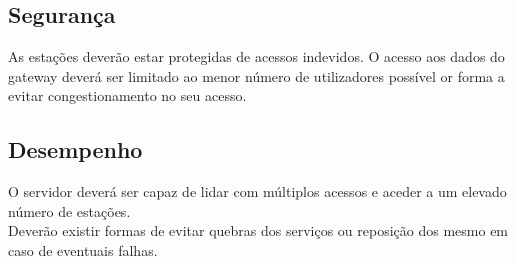 	\subsection{Segurança}
	As estações deverão estar protegidas de acessos indevidos. O acesso aos dados do gateway deverá ser limitado ao menor número de utilizadores possível or forma a evitar congestionamento no seu acesso. 

	\subsection{Desempenho}
	O servidor deverá ser capaz de lidar com múltiplos acessos e aceder a um elevado número de estações. 
\\ Deverão existir formas de evitar quebras dos serviços ou reposição dos mesmo em caso de eventuais falhas.